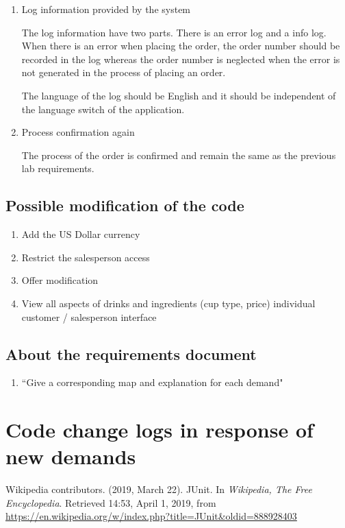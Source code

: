 \documentclass[a4paper]{report}
\begin{document}
\begin{enumerate}
\par
A valid log in operation should enable the salesperson with permission.
\item Log information provided by the system 
\par
The log information have two parts. There is an error log and a info log. When there is an error when placing the order, the order number should be recorded in the log whereas the order number is neglected when the error is not generated in the process of placing an order. 
\par
The language of the log should be English and it should be independent of the language switch of the application.
\item Process confirmation again
\par
The process of the order is confirmed and remain the same as the previous lab requirements.
\end{enumerate}
\subsection{Possible modification of the code}
\begin{enumerate}
\item Add the US Dollar currency 
\item Restrict the salesperson access 
\item Offer modification 
\item View all aspects of drinks and ingredients (cup type, price) individual customer / salesperson interface 
\end{enumerate}
\subsection{About the requirements document }
\begin{enumerate}
\item ``Give a corresponding map and explanation for each demand"
\end{enumerate}
\section{Code change logs in response of new demands}

\begin{thebibliography}{A}


Wikipedia contributors. (2019, March 22). JUnit. In \emph{Wikipedia, The Free Encyclopedia}. Retrieved 14:53, April 1, 2019, from \url{https://en.wikipedia.org/w/index.php?title=JUnit&oldid=888928403}
\end{thebibliography}
\end{document}
